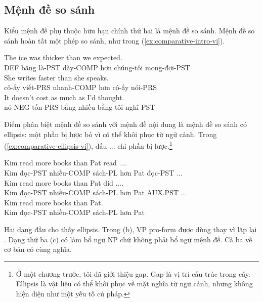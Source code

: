 \subsection{Mệnh đề so sánh}

Kiểu mệnh đề phụ thuộc hữu hạn chính thứ hai là mệnh đề so sánh. Mệnh đề so sánh hoàn tất một phép so sánh, như trong (\ref{ex:comparative-intro-vi}).

\ea \label{ex:comparative-intro-vi}
    \ea \gll The ice was thicker than {\ob}we expected{\cb}.\\
        DEF băng là-PST dày-COMP hơn chúng-tôi mong-đợi-PST\\
    \glt {}
    \ex \gll She writes faster than {\ob}she speaks{\cb}.\\
        cô-ấy viết-PRS nhanh-COMP hơn cô-ấy nói-PRS\\
    \glt {}
    \ex \gll It doesn't cost as much as {\ob}I'd thought{\cb}.\\
        nó NEG tốn-PRS bằng nhiều bằng tôi nghĩ-PST\\
    \glt {}
    \z
\z

Điểm phân biệt mệnh đề so sánh với mệnh đề nội dung là mệnh đề so sánh có ellipsis: một phần bị lược bỏ vì có thể khôi phục từ ngữ cảnh. Trong (\ref{ex:comparative-ellipsis-vi}), dấu ... chỉ phần bị lược.\footnote{Ở một chương trước, tôi đã giới thiệu gap. Gap là vị trí cấu trúc trong cây. Ellipsis là vật liệu có thể khôi phục về mặt nghĩa từ ngữ cảnh, nhưng không hiện diện như một yếu tố cú pháp.}

\ea \label{ex:comparative-ellipsis-vi}
    \ea \gll Kim read more books than {\ob}Pat read ...{\cb}.\\
        Kim đọc-PST nhiều-COMP sách-PL hơn Pat đọc-PST ...\\
    \glt {}
    \ex \gll Kim read more books than {\ob}Pat did ...{\cb}.\\
        Kim đọc-PST nhiều-COMP sách-PL hơn Pat AUX.PST ...\\
    \glt {}
    \ex \gll Kim read more books than {\ob}Pat{\cb}.\\
        Kim đọc-PST nhiều-COMP sách-PL hơn Pat\\
    \glt {}
    \z
\z

Hai dạng đầu cho thấy ellipsis. Trong (b), VP pro-form  được dùng thay vì lặp lại . Dạng thứ ba (c) có  làm bổ ngữ NP chứ không phải bổ ngữ mệnh đề. Cả ba về cơ bản có cùng nghĩa.

